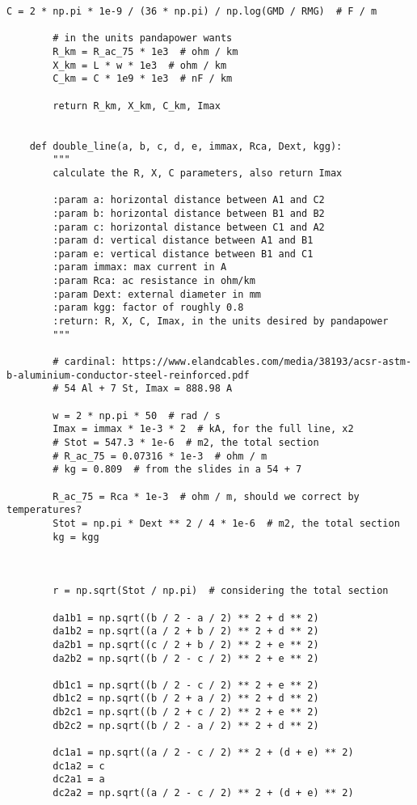 \begin{lstlisting}[caption={Code for the calculation of lines}]
        C = 2 * np.pi * 1e-9 / (36 * np.pi) / np.log(GMD / RMG)  # F / m

        # in the units pandapower wants
        R_km = R_ac_75 * 1e3  # ohm / km
        X_km = L * w * 1e3  # ohm / km
        C_km = C * 1e9 * 1e3  # nF / km

        return R_km, X_km, C_km, Imax


    def double_line(a, b, c, d, e, immax, Rca, Dext, kgg):
        """
        calculate the R, X, C parameters, also return Imax

        :param a: horizontal distance between A1 and C2
        :param b: horizontal distance between B1 and B2
        :param c: horizontal distance between C1 and A2
        :param d: vertical distance between A1 and B1
        :param e: vertical distance between B1 and C1
        :param immax: max current in A
        :param Rca: ac resistance in ohm/km
        :param Dext: external diameter in mm
        :param kgg: factor of roughly 0.8
        :return: R, X, C, Imax, in the units desired by pandapower
        """

        # cardinal: https://www.elandcables.com/media/38193/acsr-astm-b-aluminium-conductor-steel-reinforced.pdf
        # 54 Al + 7 St, Imax = 888.98 A

        w = 2 * np.pi * 50  # rad / s
        Imax = immax * 1e-3 * 2  # kA, for the full line, x2
        # Stot = 547.3 * 1e-6  # m2, the total section
        # R_ac_75 = 0.07316 * 1e-3  # ohm / m
        # kg = 0.809  # from the slides in a 54 + 7

        R_ac_75 = Rca * 1e-3  # ohm / m, should we correct by temperatures?
        Stot = np.pi * Dext ** 2 / 4 * 1e-6  # m2, the total section
        kg = kgg



        r = np.sqrt(Stot / np.pi)  # considering the total section

        da1b1 = np.sqrt((b / 2 - a / 2) ** 2 + d ** 2)
        da1b2 = np.sqrt((a / 2 + b / 2) ** 2 + d ** 2)
        da2b1 = np.sqrt((c / 2 + b / 2) ** 2 + e ** 2)
        da2b2 = np.sqrt((b / 2 - c / 2) ** 2 + e ** 2)

        db1c1 = np.sqrt((b / 2 - c / 2) ** 2 + e ** 2)
        db1c2 = np.sqrt((b / 2 + a / 2) ** 2 + d ** 2)
        db2c1 = np.sqrt((b / 2 + c / 2) ** 2 + e ** 2)
        db2c2 = np.sqrt((b / 2 - a / 2) ** 2 + d ** 2)

        dc1a1 = np.sqrt((a / 2 - c / 2) ** 2 + (d + e) ** 2)
        dc1a2 = c
        dc2a1 = a
        dc2a2 = np.sqrt((a / 2 - c / 2) ** 2 + (d + e) ** 2)


\end{lstlisting}
